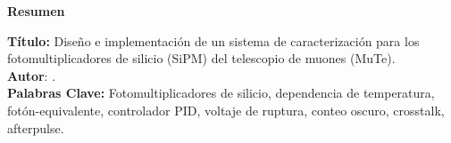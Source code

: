 \newpage
\begin{center}
\begin{Large}
\textbf{Resumen}
\end{Large}
\end{center}


\noindent \textbf{Título:} Diseño e implementación de un sistema de caracterización para los fotomultiplicadores de silicio (SiPM) del telescopio de muones (MuTe)\footnotemark[1].\\ 

\noindent \textbf{Autor}: \insertautoruno \footnotemark[2].  \\    

 
\noindent \textbf{Palabras Clave:} Fotomultiplicadores de silicio, dependencia de temperatura, fotón-equivalente, controlador PID, voltaje de ruptura, conteo oscuro, crosstalk, afterpulse.\\

